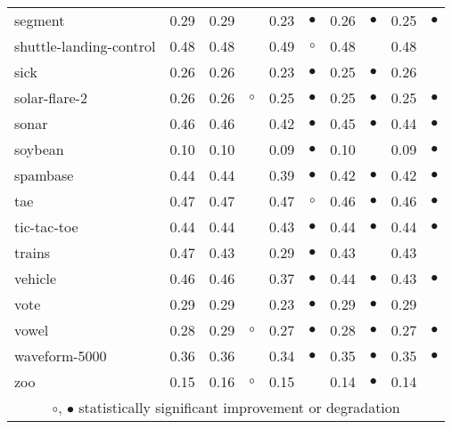 {\begin{longtable}{lrr@{\hspace{0.1cm}}cr@{\hspace{0.1cm}}cr@{\hspace{0.1cm}}cr@{\hspace{0.1cm}}c}
segment & 0.29 & 0.29 &           & 0.23 & $\bullet$ & 0.26 & $\bullet$ & 0.25 & $\bullet$\\
shuttle-landing-control & 0.48 & 0.48 &           & 0.49 &   $\circ$ & 0.48 &           & 0.48 &          \\
sick & 0.26 & 0.26 &           & 0.23 & $\bullet$ & 0.25 & $\bullet$ & 0.26 &          \\
solar-flare-2 & 0.26 & 0.26 &   $\circ$ & 0.25 & $\bullet$ & 0.25 & $\bullet$ & 0.25 & $\bullet$\\
sonar & 0.46 & 0.46 &           & 0.42 & $\bullet$ & 0.45 & $\bullet$ & 0.44 & $\bullet$\\
soybean & 0.10 & 0.10 &           & 0.09 & $\bullet$ & 0.10 &           & 0.09 & $\bullet$\\
spambase & 0.44 & 0.44 &           & 0.39 & $\bullet$ & 0.42 & $\bullet$ & 0.42 & $\bullet$\\
tae & 0.47 & 0.47 &           & 0.47 &   $\circ$ & 0.46 & $\bullet$ & 0.46 & $\bullet$\\
tic-tac-toe & 0.44 & 0.44 &           & 0.43 & $\bullet$ & 0.44 & $\bullet$ & 0.44 & $\bullet$\\
trains & 0.47 & 0.43 &           & 0.29 & $\bullet$ & 0.43 &           & 0.43 &          \\
vehicle & 0.46 & 0.46 &           & 0.37 & $\bullet$ & 0.44 & $\bullet$ & 0.43 & $\bullet$\\
vote & 0.29 & 0.29 &           & 0.23 & $\bullet$ & 0.29 & $\bullet$ & 0.29 &          \\
vowel & 0.28 & 0.29 &   $\circ$ & 0.27 & $\bullet$ & 0.28 & $\bullet$ & 0.27 & $\bullet$\\
waveform-5000 & 0.36 & 0.36 &           & 0.34 & $\bullet$ & 0.35 & $\bullet$ & 0.35 & $\bullet$\\
zoo & 0.15 & 0.16 &   $\circ$ & 0.15 &           & 0.14 & $\bullet$ & 0.14 &          \\
\hline
\multicolumn{10}{c}{$\circ$, $\bullet$ statistically significant improvement or degradation}\\
\end{longtable} \footnotesize \par}